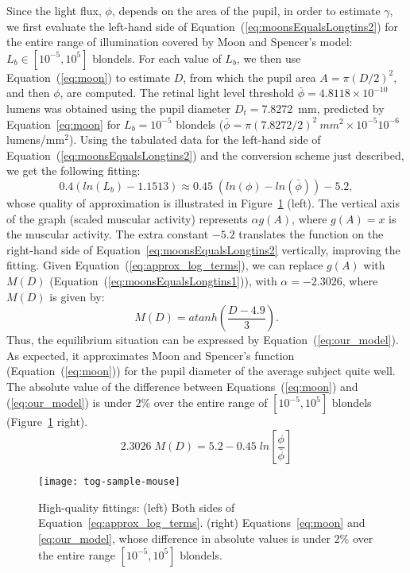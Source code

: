 \documentclass{dnacm} %
\begin{document}
Since the light flux, $\phi$, depends on the area of the pupil, in order
to estimate $\gamma$, we first evaluate the left-hand side of
Equation~(\ref{eq:moonsEqualsLongtins2}) for the entire range of
illumination covered by Moon and Spencer's model: $L_b \in [10^{-5},
10^{5}]$ blondels. For each value of $L_b$, we then use
Equation~(\ref{eq:moon}) to estimate $D$, from which the pupil area $A =
\pi(D/2)^2$, and then $\phi$, are computed. The retinal light level
threshold $\bar{\phi} = 4.8118\times10^{-10}$ lumens was obtained using
the pupil diameter $D_t=7.8272$~mm, predicted by Equation~\ref{eq:moon}
for $L_b = 10^{-5}$ blondels ($\bar{\phi} = \pi(7.8272 / 2)^2~mm^2
\times 10^{-5} 10^{-6}$ lumens/mm$^2$). Using the tabulated data for the
left-hand side of Equation~(\ref{eq:moonsEqualsLongtins2}) and the
conversion scheme just described, we get the following fitting:
\begin{equation}
  0.4 ( {{ln}}(L_{b}) -1.1513)      \approx  0.45 \; ({{ln}}(\phi) - {{ln}}(\bar{\phi})) -5.2,
 \label{eq:approx_log_terms}
\end{equation}
whose quality of approximation is illustrated in
Figure~\ref{fig:Longtin_v_Moon_right_and_comparison} (left). The
vertical axis of the graph (scaled muscular activity) represents $\alpha
g(A)$, where $g(A) = x$ is the muscular activity. The extra constant
$-5.2$ translates the function on the right-hand side of
Equation~\ref{eq:moonsEqualsLongtins2} vertically, improving the
fitting. Given Equation~(\ref{eq:approx_log_terms}), we can replace
$g(A)$ with $M(D)$ (Equation~(\ref{eq:moonsEqualsLongtins1})), with
$\alpha = -2.3026$, where $M(D)$ is given by:
\begin{equation}
  M(D) = {{atanh}} \left( \frac{D-4.9}{3} \right).
  \label{eq:our_function_for_elasto_mechanical_prop}
\end{equation}
Thus, the equilibrium situation can be expressed by
Equation~(\ref{eq:our_model}). As expected, it approximates Moon and
Spencer's function (Equation~(\ref{eq:moon})) for the pupil diameter of
the average subject quite well. The absolute value of the difference
between Equations~(\ref{eq:moon}) and (\ref{eq:our_model}) is under
$2\%$ over the entire range of $[10^{-5}, 10^{5}]$ blondels
(Figure~\ref{fig:Longtin_v_Moon_right_and_comparison} right).
\begin{equation}
\label{eq:our_model}
  2.3026 \; M(D)  =  5.2 - 0.45 \; {{ln}} \left[\frac{\phi}{\bar{\phi}} \right]
\end{equation}
%
\begin{figure}[t]
\centerline{\texttt{[image: tog-sample-mouse]}}
\caption{High-quality fittings: (left) Both sides of
Equation~\ref{eq:approx_log_terms}. (right) Equations~\ref{eq:moon} and
\ref{eq:our_model}, whose difference in absolute values is under $2\%$
over the entire range $[10^{-5}, 10^{5}]$ blondels.}
    \label{fig:Longtin_v_Moon_right_and_comparison}
\end{figure}
%
\end{document}
